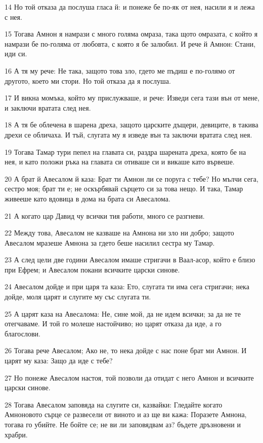 \par 14 Но той отказа да послуша гласа й: и понеже бе по-як от нея, насили я и лежа с нея.
\par 15 Тогава Амнон я намрази с много голяма омраза, така щото омразата, с който я намрази бе по-голяма от любовта, с която я бе залюбил. И рече й Амнон: Стани, иди си.
\par 16 А тя му рече: Не така, защото това зло, гдето ме пъдиш е по-голямо от другото, което ми стори. Но той отказа да я послуша.
\par 17 И викна момъка, който му прислужваше, и рече: Изведи сега тази вън от мене, и заключи вратата след нея.
\par 18 А тя бе облечена в шарена дреха, защото царските дъщери, девиците, в такива дрехи се обличаха. И тъй, слугата му я изведе вън та заключи вратата след нея.
\par 19 Тогава Тамар тури пепел на главата си, раздра шарената дреха, която бе на нея, и като положи ръка на главата си отиваше си и викаше като вървеше.
\par 20 А брат й Авесалом й каза: Брат ти Амнон ли се поруга с тебе? Но мълчи сега, сестро моя; брат ти е; не оскърбявай сърцето си за това нещо. И така, Тамар живееше като вдовица в дома на брата си Авесалома.
\par 21 А когато цар Давид чу всички тия работи, много се разгневи.
\par 22 Между това, Авесалом не казваше на Амнона ни зло ни добро; защото Авесалом мразеше Амнона за гдето беше насилил сестра му Тамар.
\par 23 А след цели две години Авесалом имаше стригачи в Ваал-асор, който е близо при Ефрем; и Авесалом покани всичките царски синове.
\par 24 Авесалом дойде и при царя та каза: Ето, слугата ти има сега стригачи; нека дойде, моля царят и слугите му със слугата ти.
\par 25 А царят каза на Авесалома: Не, сине мой, да не идем всички; за да не те отегчаваме. И той го молеше настойчиво; но царят отказа да иде, а го благослови.
\par 26 Тогава рече Авесалом; Ако не, то нека дойде с нас поне брат ми Амнон. И царят му каза: Защо да иде с тебе?
\par 27 Но понеже Авесалом настоя, той позволи да отидат с него Амнон и всичките царски синове.
\par 28 Тогава Авесалом заповяда на слугите си, казвайки: Гледайте когато Амноновото сърце се развесели от виното и аз ще ви кажа: Поразете Амнона, тогава го убийте. Не бойте се; не ви ли заповядвам аз? бъдете дръзновени и храбри.
